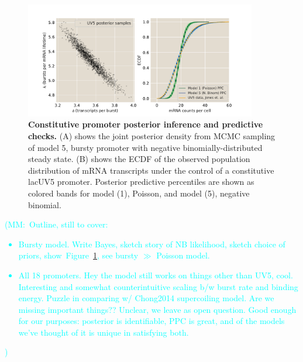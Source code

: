 \documentclass[12pt]{article}%
\newcommand{\mmnote}[1]{\textcolor{cyan}{(MM:~#1)}}
\newcommand{\fig}[1]{Figure~\ref{#1}}
\begin{document}
\begin{figure}%
\centering
\includegraphics[width=0.9\textwidth]{../figures/fig2/fig2pt1.pdf}
\caption{\textbf{Constitutive promoter posterior
        inference and predictive checks.}
        (A) shows the joint posterior density from MCMC sampling of model 5,
        bursty promoter with negative binomially-distributed steady state.
        (B) shows the ECDF of the observed population distribution
        of mRNA transcripts under the control of a constitutive lacUV5 promoter.
        Posterior predictive percentiles are shown as colored bands for
        model (1), Poisson, and model (5), negative binomial.
        }
\label{fig:uv5_post}
\end{figure}
        
\mmnote{Outline, still to cover:
\begin{itemize}
\item Bursty model. Write Bayes, sketch story of NB likelihood, sketch choice
of priors, show~\fig{fig:uv5_post}, see bursty $\gg$ Poisson model.
\item All 18 promoters. Hey the model still works on things other than
UV5, cool. Interesting and somewhat counterintuitive scaling b/w
burst rate and binding energy. Puzzle in comparing w/ Chong2014
supercoiling model. Are we missing important things?? Unclear, we
leave as open question. Good enough for our purposes: posterior is identifiable, PPC is great, and of the models we've thought of it is unique in satisfying both.
\end{itemize}
}
\end{document}
